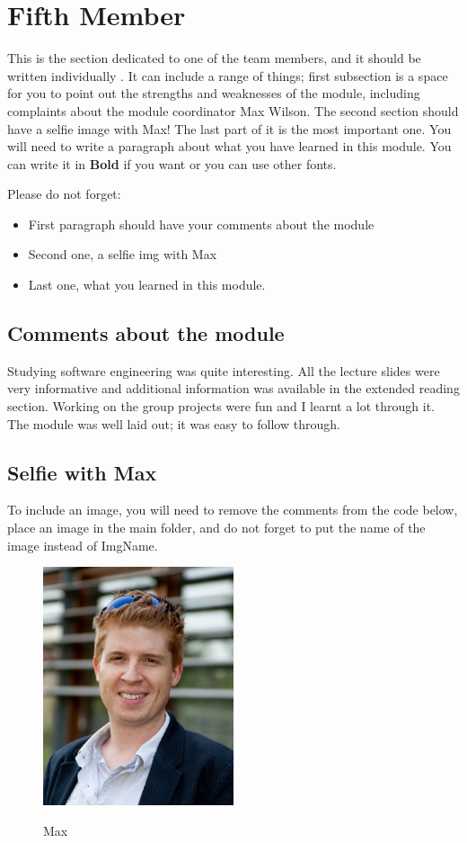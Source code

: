 \section{Fifth Member}
This is the section dedicated to one of the team members, and it should be written individually . It can include a range of things; first subsection is a space for you to point out the strengths and weaknesses of the module, including complaints about the module coordinator Max Wilson. The second section should have a selfie image with Max! The last part of it is the most important one. You will need to write a paragraph about what you have learned in this module. You can write it in \textbf{Bold} if you want or you can use other fonts. 

Please do not forget:
\begin{itemize}
	\item First paragraph should have your comments about the module
	\item Second one, a selfie img with Max
	\item Last one, what you learned in this module.
\end{itemize}

\subsection{Comments about the module}
Studying software engineering was quite interesting. All the lecture slides were very informative and additional information was available in the extended reading section. Working on the group projects were fun and I learnt a lot through it. The module was well laid out; it was easy to follow through. 
\subsection{Selfie with Max}

To include an image, you will need to remove the comments from the code below, place an image in the main folder, and do not forget to put the name of the image instead of ImgName. 

\begin{figure}[h]
\caption{Max}
\centering
\includegraphics[width=0.5\textwidth]{maxWilson}
\label{fig:selfie}
\end{figure}

